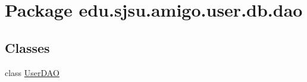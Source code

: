 \hypertarget{namespaceedu_1_1sjsu_1_1amigo_1_1user_1_1db_1_1dao}{}\section{Package edu.\+sjsu.\+amigo.\+user.\+db.\+dao}
\label{namespaceedu_1_1sjsu_1_1amigo_1_1user_1_1db_1_1dao}
\subsection*{Classes}
\begin{DoxyCompactItemize}
\item 
class \hyperlink{classedu_1_1sjsu_1_1amigo_1_1user_1_1db_1_1dao_1_1_user_d_a_o}{User\+D\+AO}
\end{DoxyCompactItemize}

